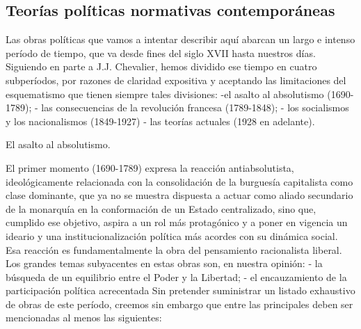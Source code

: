\documentclass[
]{book}
\begin{document}
\hypertarget{teoruxedas-poluxedticas-normativas-contemporuxe1neas}{%
\subsection*{Teorías políticas normativas contemporáneas}\label{teoruxedas-poluxedticas-normativas-contemporuxe1neas}}

Las obras políticas que vamos a intentar describir aquí abarcan un largo e intenso período de tiempo, que va desde fines del siglo XVII hasta nuestros días. Siguiendo en parte a J.J. Chevalier, hemos dividido ese tiempo en cuatro subperíodos, por razones de claridad expositiva y aceptando las limitaciones del esquematismo que tienen siempre tales divisiones: -el asalto al absolutismo (1690-1789); - las consecuencias de la revolución francesa (1789-1848); - los socialismos y los nacionalismos (1849-1927) - las teorías actuales (1928 en adelante).

El asalto al absolutismo.

El primer momento (1690-1789) expresa la reacción antiabsolutista, ideológicamente relacionada con la consolidación de la burguesía capitalista como clase dominante, que ya no se muestra dispuesta a actuar como aliado secundario de la monarquía en la conformación de un Estado centralizado, sino que, cumplido ese objetivo, aspira a un rol más protagónico y a poner en vigencia un ideario y una institucionalización política más acordes con su dinámica social. Esa reacción es fundamentalmente la obra del pensamiento racionalista liberal. Los grandes temas subyacentes en estas obras son, en nuestra opinión: - la búsqueda de un equilibrio entre el Poder y la Libertad; - el encauzamiento de la participación política acrecentada Sin pretender suministrar un listado exhaustivo de obras de este período, creemos sin embargo que entre las principales deben ser mencionadas al menos las siguientes:
\end{document}
